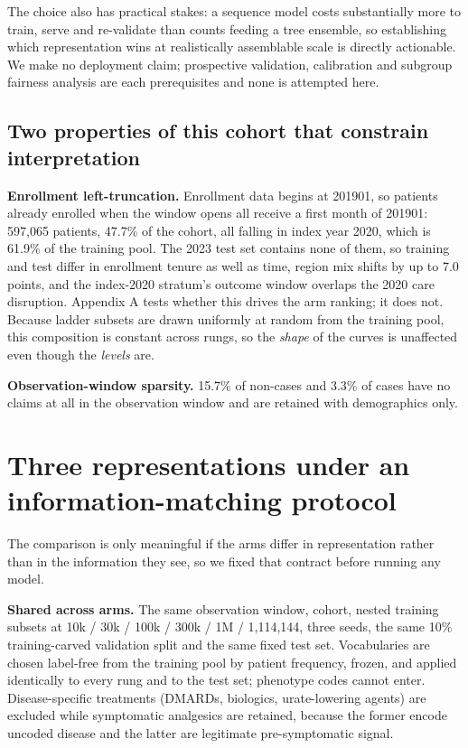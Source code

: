 \documentclass[10pt,twocolumn,letterpaper]{article}
\begin{document}
The choice also has practical stakes: a sequence model costs substantially more to train, serve and re-validate than counts feeding a tree ensemble, so establishing which representation wins at realistically assemblable scale is directly actionable. We make no deployment claim; prospective validation, calibration and subgroup fairness analysis are each prerequisites and none is attempted here.



\subsection{Two properties of this cohort that constrain interpretation}\label{sec:2.2}



\textbf{Enrollment left-truncation.} Enrollment data begins at 201901, so patients already enrolled when the window opens all receive a first month of 201901: 597,065 patients, 47.7\% of the cohort, all falling in index year 2020, which is 61.9\% of the training pool. The 2023 test set contains none of them, so training and test differ in enrollment tenure as well as time, region mix shifts by up to 7.0 points, and the index-2020 stratum's outcome window overlaps the 2020 care disruption. Appendix A tests whether this drives the arm ranking; it does not. Because ladder subsets are drawn uniformly at random from the training pool, this composition is constant across rungs, so the \emph{shape} of the curves is unaffected even though the \emph{levels} are.



\textbf{Observation-window sparsity.} 15.7\% of non-cases and 3.3\% of cases have no claims at all in the observation window and are retained with demographics only.







\section{Three representations under an information-matching protocol}\label{sec:3}



The comparison is only meaningful if the arms differ in representation rather than in the information they see, so we fixed that contract before running any model.



\textbf{Shared across arms.} The same observation window, cohort, nested training subsets at 10k / 30k / 100k / 300k / 1M / 1,114,144, three seeds, the same 10\% training-carved validation split and the same fixed test set. Vocabularies are chosen label-free from the training pool by patient frequency, frozen, and applied identically to every rung and to the test set; phenotype codes cannot enter. Disease-specific treatments (DMARDs, biologics, urate-lowering agents) are excluded while symptomatic analgesics are retained, because the former encode uncoded disease and the latter are legitimate pre-symptomatic signal.
\end{document}

